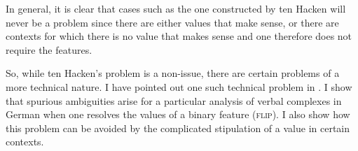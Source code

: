In general, it is clear that cases such as the one constructed by ten Hacken will never be a problem since there are either
values that make sense, or there are contexts for which there is no value that makes sense and one therefore does not require
the features.

So, while ten Hacken's problem is a non-issue, there are certain problems of a more technical
nature. I have pointed out one such technical problem in . I show
that spurious ambiguities arise for a particular analysis of verbal complexes in German when one
resolves the values of a binary feature (\textsc{flip}).  I also show how this problem can be
avoided by the complicated stipulation of a value in certain contexts.%


